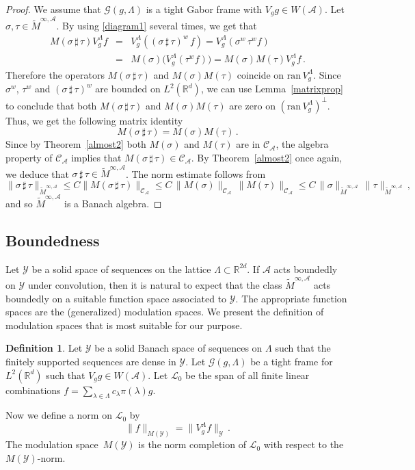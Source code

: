 \documentclass[12pt]{amsart}
\theoremstyle{definition}
\newtheorem{definition}{Definition}[section]
\theoremstyle{remark}
\numberwithin{equation}{section}
\newcommand{\modsp}{modulation space}
\newcommand{\symbo}{\widetilde M^{\infty, \cA}}
\def\cG{\mathcal{G}}
\def\cA{\mathcal{A}}
\def\cL{\mathcal{L}}
\def\cC{\mathcal{C}}
\def\cY{\mathcal{Y}}
\def\bR{{\mathbb{R}}}
\def\cca{\Cal C_\ac}
\def\rd{\bR^d}
\def\rdd{{\bR^{2d}}}
\def\lrd{L^2(\rd)}
\def\cG{\mathcal{G}}
\def\cA{\mathcal{A}}
\def\cC{\mathcal{C}}
\newcommand{\Cal}{\mathcal}
\newcommand{\La}{\Lambda}
\newcommand{\ac}{\Cal A}
\begin{document}
\begin{proof}
We assume that $\cG (g, \Lambda )$ is a tight Gabor frame with $V_gg
\in W(\cA )$. 
Let $\sigma , \tau \in \widetilde M^{\infty,\ac}$. By
using \eqref{diagram1} several times,  we get that
\begin{eqnarray*}
  M(\sigma \, \sharp \, \tau ) V_g^\La f &=& V_g^\La ( (\sigma \, \sharp \,
  \tau )^w  \, f) = V_g^\La (\sigma^w \, \tau ^w f) \\
&=& M(\sigma ) \big( V_g^\La (\tau ^w f )) = M(\sigma ) M(\tau )
V_g^\La f \, .
\end{eqnarray*}
Therefore the operators $M(\sigma\, \sharp\, \tau )$ and $M(\sigma
) M(\tau )$ coincide on $\mathrm{ran} \, V_g^\La$. Since
$\sigma^w$, $\tau^w$ and $(\sigma\,\sharp\,\tau)^w$ are bounded on
$\lrd$, we can use Lemma~\ref{matrixprop} to conclude that both
$M(\sigma\, \sharp\, \tau )$ and $M(\sigma ) M(\tau )$ are zero on
$(\mathrm{ran} \, V_g^\La)^\perp$. Thus, we get the following
matrix identity
\begin{equation}
  \label{eq:21}
M(\sigma \, \sharp \, \tau ) =   M(\sigma ) M(\tau )\,.
\end{equation}
Since by Theorem~\ref{almost2} both $M(\sigma )$ and $M(\tau )$ are in $\cC
_{\cA  }$, the algebra property of $\cC _{\cA }$ implies that
$M(\sigma \, \sharp \, \tau ) \in \cC _{\cA }$. By Theorem~\ref{almost2} once
again, we deduce that $\sigma \, \sharp \, \tau \in \symbo $. 
 The  norm estimate follows from 
 $$
\|\sigma \, \sharp \, \tau \| _{\widetilde M^{\infty,\ac}} \leq C
\|M(\sigma \, \sharp \, \tau )\|_{\cca} \leq  C \, \|M(\sigma
)\|_{\cca}\, \|M(\tau )\|_{\cca} \leq C \, \|\sigma \|_{\widetilde
M^{\infty,\ac}} \, \|\tau \|_{\widetilde M^{\infty,\ac}} \, , $$
and so $\symbo$ is a Banach algebra.
\end{proof}


\subsection{Boundedness} Let $\cY$ be a solid space of sequences on the lattice $\La\subset
\rdd $. If $\ac$ acts boundedly on $\cY$ under convolution, then
it is
natural to expect that the
class $\widetilde M^{\infty,\ac}$  acts boundedly on a
suitable
function space associated to $\cY$.
The appropriate function spaces are the (generalized) \modsp s. We
present the definition of \modsp s that is most suitable for our
purpose.

\begin{definition}\label{genmod}
  Let $\cY$ be a solid Banach space of sequences on $\Lambda $ such that
the finitely supported  sequences are dense in $\cY$. Let $\cG (g,
\Lambda )$ be a tight frame for $\lrd $ such that $V_gg \in
W(\cA)$. Let $\cL _0$ be the span of all finite linear
combinations $f = \sum _{\lambda \in \Lambda } c_\lambda \pi
(\lambda )g$.

Now we define a norm on $\cL _0$ by
\begin{equation}
  \label{eq:hh3}
  \|f\|_{M(\cY)}=\|V_g^\La f\|_\cY \, .
\end{equation}
The \modsp\ $M(\cY)$ is the norm completion of $\cL _0$ with
respect to
the $M(\cY)$-norm.
\end{definition}
\end{document}
